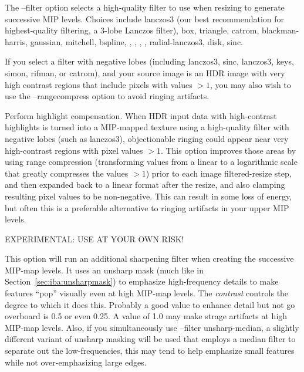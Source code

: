 The {\cf --filter} option selects a high-quality filter to use when
resizing to generate successive MIP levels.  Choices include
{\cf lanczos3} (our best recommendation for highest-quality filtering, a
3-lobe Lanczos filter), {\cf box}, {\cf triangle}, {\cf catrom},
{\cf blackman-harris}, {\cf gaussian}, {\cf mitchell}, {\cf bspline},
, , ,
, {\cf radial-lanczos3}, {\cf disk}, {\cf sinc}.

If you select a filter with negative lobes (including
{\cf lanczos3}, {\cf sinc}, {\cf lanczos3}, {\cf keys}, {\cf simon},
{\cf rifman}, or {\cf catrom}), and your
source image is an HDR image with very high contrast regions that
include pixels with values $>1$, you may also wish to use the
{\cf --rangecompress} option to avoid ringing artifacts.
\apiend

Perform highlight compensation.  When HDR input data with high-contrast
highlights is turned into a MIP-mapped texture using a high-quality
filter with negative lobes (such as {\cf lanczos3}), objectionable
ringing could appear near very high-contrast regions with pixel values
$>1$. This option improves those areas by using range compression
(transforming values from a linear to a logarithmic scale that greatly
compresses the values $> 1$) prior to each
image filtered-resize step, and then expanded back to a linear format
after the resize, and also clamping resulting pixel values to be
non-negative.  This can result in some loss of energy, but often this is
a preferable alternative to ringing artifacts in your upper MIP levels.
\apiend

EXPERIMENTAL: USE AT YOUR OWN RISK!

This option will run an additional sharpening filter
when creating the successive MIP-map levels. It uses an unsharp mask
(much like in Section~\ref{sec:iba:unsharpmask}) to emphasize high-frequency
details to make features ``pop'' visually even at high MIP-map levels.
The \emph{contrast} controls the degree to which it does this. Probably
a good value to enhance detail but not go overboard is 0.5 or even 0.25.
A value of 1.0 may make strage artifacts at high MIP-map levels. Also, if
you simultaneously use {\cf --filter unsharp-median}, a slightly different
variant of unsharp masking will be used that employs a median filter to
separate out the low-frequencies, this may tend to help emphasize small
features while not over-emphasizing large edges. 
\apiend

